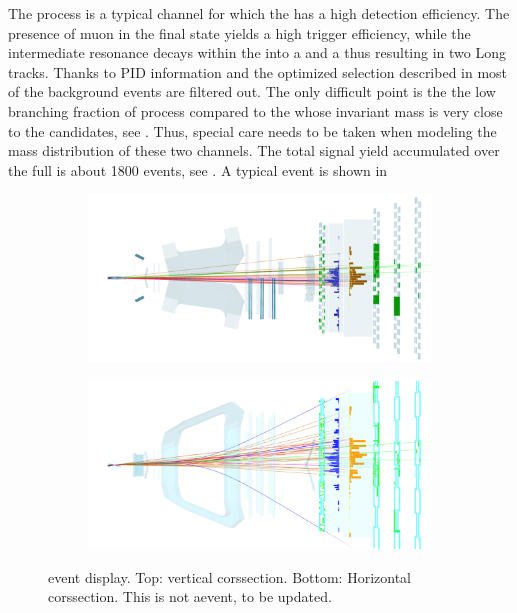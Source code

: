 The \BsJpsiKst process is a typical channel for which the \lhcb has a high detection efficiency.
The presence of muon in the final state yields a high trigger efficiency, while the intermediate
\Kstar resonance decays within the \velo into a \kaon and a \pion thus resulting in two Long tracks.
Thanks to PID information and the optimized selection described in  most of the background
events are filtered out. The only difficult point is the the low branching fraction of \BsJpsiKst process
compared to the \BdJpsiKst whose invariant mass is very close to the \BsJpsiKst candidates, see .
Thus, special care needs to be taken when modeling the mass distribution of these two channels.
The total \BsJpsiKst signal yield accumulated over the full \runone is about 1800 events, see .
A typical \BsJpsiKst event is  shown in 

\begin{figure}[t]
  \centering
  \begin{subfigure}{\textwidth}
    \raggedright
    \includegraphics[width=\textwidth]{Figures/Chapter2/top}
    \caption{}
    \label{det_evt_display_top}
  \end{subfigure}
  \begin{subfigure}{\textwidth}
    \raggedleft
    \includegraphics[width=\textwidth]{Figures/Chapter2/side}
    \caption{}
    \label{det_evt_display_side}
  \end{subfigure}
  \caption{\BsJpsiKst event display. Top: vertical corssection. Bottom: Horizontal corssection.
  {\color{red} This is not a\BsJpsiKst event, to be updated.}}
  \label{det_evt_display}
\end{figure}

